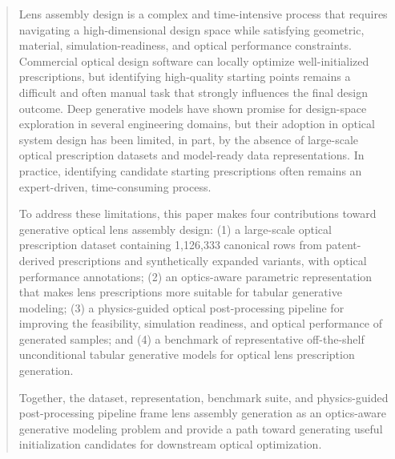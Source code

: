 \begin{abstract}
Lens assembly design is a complex and time-intensive process that requires navigating a high-dimensional design space while satisfying geometric, material, simulation-readiness, and optical performance constraints. Commercial optical design software can locally optimize well-initialized prescriptions, but identifying high-quality starting points remains a difficult and often manual task that strongly influences the final design outcome. Deep generative models have shown promise for design-space exploration in several engineering domains, but their adoption in optical system design has been limited, in part, by the absence of large-scale optical prescription datasets and model-ready data representations. In practice, identifying candidate starting prescriptions often remains an expert-driven, time-consuming process.

To address these limitations, this paper makes four contributions toward generative optical lens assembly design: (1) a large-scale optical prescription dataset containing 1,126,333 canonical rows from patent-derived prescriptions and synthetically expanded variants, with optical performance annotations; (2) an optics-aware parametric representation that makes lens prescriptions more suitable for tabular generative modeling; (3) a physics-guided optical post-processing pipeline for improving the feasibility, simulation readiness, and optical performance of generated samples; and (4) a benchmark of representative off-the-shelf unconditional tabular generative models for optical lens prescription generation.

Together, the dataset, representation, benchmark suite, and physics-guided post-processing pipeline frame lens assembly generation as an optics-aware generative modeling problem and provide a path toward generating useful initialization candidates for downstream optical optimization.
\end{abstract}
